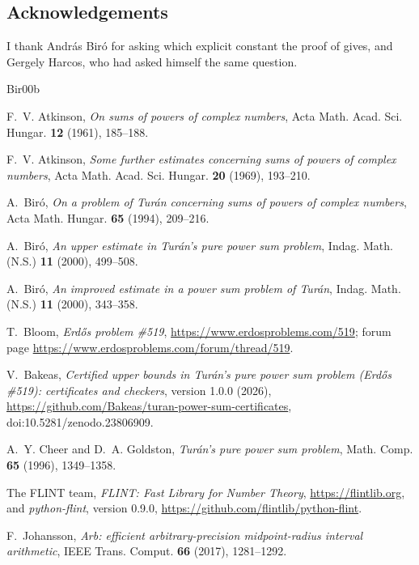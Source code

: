 \documentclass[11pt]{amsart}
\theoremstyle{remark}
\theoremstyle{plain}
\begin{document}
\subsection*{Acknowledgements}
I thank Andr\'as Bir\'o for asking which explicit constant the proof of \cite{Bir00b} gives, and Gergely Harcos, who had asked himself the same question.

\begin{thebibliography}{Bir00b}

F.~V. Atkinson, \emph{On sums of powers of complex numbers}, Acta Math. Acad. Sci. Hungar. \textbf{12} (1961), 185--188.

F.~V. Atkinson, \emph{Some further estimates concerning sums of powers of complex numbers}, Acta Math. Acad. Sci. Hungar. \textbf{20} (1969), 193--210.

A.~Bir\'o, \emph{On a problem of Tur\'an concerning sums of powers of complex numbers}, Acta Math. Hungar. \textbf{65} (1994), 209--216.

A.~Bir\'o, \emph{An upper estimate in Tur\'an's pure power sum problem}, Indag. Math. (N.S.) \textbf{11} (2000), 499--508.

A.~Bir\'o, \emph{An improved estimate in a power sum problem of Tur\'an}, Indag. Math. (N.S.) \textbf{11} (2000), 343--358.

T.~Bloom, \emph{Erd\H{o}s problem \#519}, \url{https://www.erdosproblems.com/519}; forum page \url{https://www.erdosproblems.com/forum/thread/519}.

V.~Bakeas, \emph{Certified upper bounds in Tur\'an's pure power sum problem (Erd\H{o}s \#519): certificates and checkers}, version 1.0.0 (2026), \url{https://github.com/Bakeas/turan-power-sum-certificates}, doi:10.5281/zenodo.23806909.

A.~Y. Cheer and D.~A. Goldston, \emph{Tur\'an's pure power sum problem}, Math. Comp. \textbf{65} (1996), 1349--1358.

The FLINT team, \emph{FLINT: Fast Library for Number Theory}, \url{https://flintlib.org}, and \emph{python-flint}, version 0.9.0, \url{https://github.com/flintlib/python-flint}.

F.~Johansson, \emph{Arb: efficient arbitrary-precision midpoint-radius interval arithmetic}, IEEE Trans. Comput. \textbf{66} (2017), 1281--1292.


\end{thebibliography}
\end{document}
